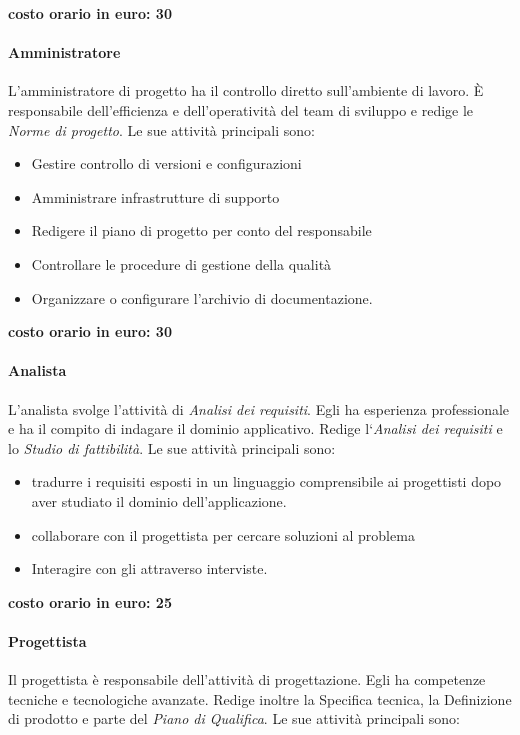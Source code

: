 \documentclass[../norme-di-progetto.tex]{subfiles}
\begin{document}
\textbf{costo orario in euro: 30}

\paragraph{Amministratore}%
\label{par:amministratore}
L'amministratore di progetto ha il controllo diretto sull'ambiente di lavoro. È responsabile dell'efficienza e dell'operatività del team di sviluppo e redige le \textit{Norme di progetto}. Le sue attività principali sono:

\begin{itemize}
  \item Gestire controllo di versioni e configurazioni
  \item Amministrare infrastrutture di supporto
  \item Redigere il piano di progetto per conto del responsabile
  \item Controllare le procedure di gestione della qualità
  \item Organizzare o configurare l'archivio di documentazione.
\end{itemize}

\textbf{costo orario in euro: 30}

\paragraph{Analista}%
\label{par:analista}
L'analista svolge l'attività di \textit{Analisi dei requisiti}.
Egli ha esperienza professionale e ha il compito di indagare il dominio applicativo.
Redige l`\textit{Analisi dei requisiti} e lo \textit{Studio di fattibilità}. Le sue attività principali sono:

\begin{itemize}
  \item tradurre i requisiti esposti in un linguaggio comprensibile ai progettisti dopo aver studiato il dominio dell'applicazione.
  \item collaborare con il progettista per cercare soluzioni al problema
  \item Interagire con gli  attraverso interviste.
\end{itemize}

\textbf{costo orario in euro: 25}

\paragraph{Progettista}%
\label{par:progettista}
Il progettista è responsabile dell'attività di progettazione.
Egli ha competenze tecniche e tecnologiche avanzate.
Redige inoltre la Specifica tecnica, la Definizione di prodotto e parte del \textit{Piano di Qualifica}.
Le sue attività principali sono:
\end{document}
